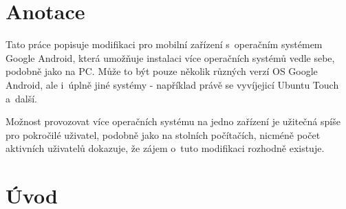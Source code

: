 \documentclass[12pt, a4paper, oneside]{article}
\begin{document}
\section*{Anotace}


Tato práce popisuje modifikaci pro mobilní zařízení s~operačním systémem Google Android, která umožňuje instalaci více operačních systémů vedle sebe, podobně jako na PC. Může to být pouze několik různých verzí OS Google Android, ale i~úplně jiné systémy - například právě se vyvíjejicí Ubuntu Touch a~další.

Možnost provozovat více operačních systému na jedno zařízení je užitečná spíše pro pokročilé uživatel, podobně jako na stolních počítačích, nicméně počet aktivních uživatelů dokazuje, že zájem o~tuto modifikaci rozhodně existuje.

\addtolength{\textheight}{30mm} %

\newpage
\pagestyle{plain}

\setlength{\voffset}{-20mm} %
\setcounter{page}{1}  %

\tableofcontents  %

\addtolength{\textheight}{-30mm} %
\newpage
\setlength{\voffset}{0mm} %
\pagestyle{plain}

%
\section*{Úvod}
\label{uvod}
\end{document}
